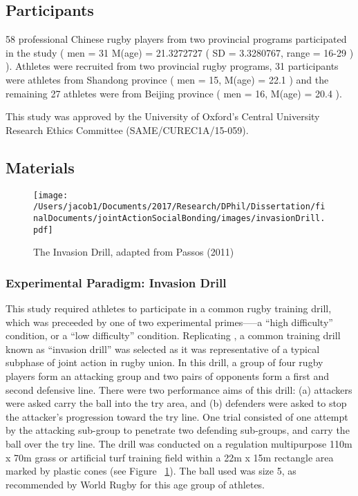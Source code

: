 \documentclass[english]{article}\usepackage[]{graphicx}\usepackage[]{color}
\begin{document}
\subsection{Participants}
58 professional Chinese rugby players from two provincial programs participated in the study
(
men =
  31
M(age) =
  21.3272727
(
SD =
  3.3280767,
range = 16-29
)
).
Athletes were recruited from two provincial rugby programs,
  31
participants were athletes from Shandong province
(
men =
  15,
M(age) =
  22.1
)
and the remaining
  27
athletes were from Beijing province
(
men =
  16,
M(age) =
  20.4
).

This study was approved by the University of Oxford’s Central University Research Ethics Committee (SAME/CUREC1A/15-059).



\subsection{Materials}

\begin{figure}[htbp]
  \texttt{[image: /Users/jacob1/Documents/2017/Research/DPhil/Dissertation/finalDocuments/jointActionSocialBonding/images/invasionDrill.pdf]}
  \caption{The Invasion Drill, adapted from Passos (2011)}
  \label{fig:invasionDrill}
\end{figure}

\subsubsection{Experimental Paradigm: Invasion Drill}
This study required athletes to participate in a common rugby training drill, which was preceeded by one of two experimental primes—--a ``high difficulty'' condition, or a ``low difficulty'' condition.   Replicating \textcite{Passos2011}, a common training drill known as ``invasion drill'' \citep{Biscombe1998} was selected as it was representative of a typical subphase of joint action in rugby union.
In this drill, a group of four rugby players form an attacking group and two pairs of opponents form a first and second defensive line.  There were two performance aims of this drill: (a) attackers were asked carry the ball into the try area, and (b) defenders were asked to stop the attacker’s progression toward the try line.
One trial consisted of one attempt by the attacking sub-group to penetrate two defending sub-groups, and carry the ball over the try line. The drill was conducted on a regulation multipurpose 110m x 70m grass or artificial turf training field within a 22m x 15m rectangle area marked by plastic cones (see Figure ~\ref{fig:invasionDrill}). The ball used was size 5, as recommended by World Rugby for this age group of athletes.
\end{document}
